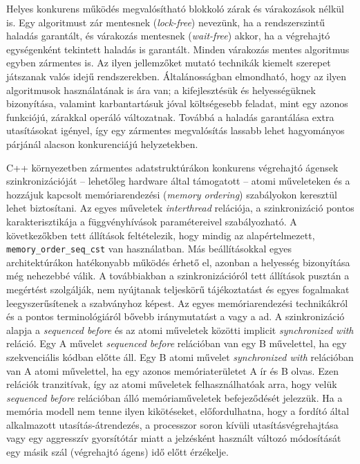     Helyes konkurens működés megvalósítható blokkoló zárak és várakozások nélkül is. Egy algoritmust zár mentesnek (\emph{lock-free}) nevezünk, ha a rendszerszintű haladás garantált, és várakozás mentesnek (\emph{wait-free}) akkor, ha a végrehajtó egységenként tekintett haladás is garantált. Minden várakozás mentes algoritmus egyben zármentes is. Az ilyen jellemzőket mutató technikák kiemelt szerepet játszanak valós idejű rendszerekben. Általánosságban elmondható, hogy az ilyen algoritmusok használatának is ára van; a kifejlesztésük és helyességüknek bizonyítása, valamint karbantartásuk jóval költségesebb feladat, mint egy azonos funkciójú, zárakkal operáló változatnak. Továbbá a haladás garantálása extra utasításokat igényel, így egy zármentes megvalósítás lassabb lehet hagyományos párjánál alacson konkurenciájú helyzetekben.
    
    C++ környezetben zármentes adatstruktúrákon konkurens végrehajtó ágensek szinkronizációját -- lehetőleg hardware által támogatott -- atomi műveleteken és a hozzájuk kapcsolt memóriarendezési (\emph{memory ordering}) szabályokon keresztül lehet biztosítani. Az egyes műveletek \emph{interthread} relációja, a szinkronizáció pontos karakterisztikája a függvényhívások paramétereivel szabályozható. A következőkben tett állítások feltételezik, hogy mindig az alapértelmezett, \texttt{memory\_order\_seq\_cst} van használatban. Más beállításokkal egyes architektúrákon hatékonyabb működés érhető el, azonban a helyesség bizonyítása még nehezebbé válik. A továbbiakban a szinkronizációról tett állítások pusztán a megértést szolgálják, nem nyújtanak teljeskörű tájékoztatást és egyes fogalmakat leegyszerűsítenek a szabványhoz képest. Az egyes memóriarendezési technikákról és a pontos terminológiáról bővebb iránymutatást a \cite{ConcurrencyInAction} vagy a \cite{C++11/MemoryModel} ad. A szinkronizáció alapja a \emph{sequenced before} és az atomi műveletek közötti implicit \emph{synchronized with} reláció. Egy A művelet \emph{sequenced before} relációban van egy B művelettel, ha egy szekvenciális kódban előtte áll. Egy B atomi művelet \emph{synchronized with} relációban van A atomi művelettel, ha egy azonos memóriaterületet A ír és B olvas. Ezen relációk tranzitívak, így az atomi műveletek felhasználhatóak arra, hogy velük \emph{sequenced before} relációban álló memóriaműveletek befejeződését jelezzük. Ha a memória modell nem tenne ilyen kikötéseket, előfordulhatna, hogy a fordító által alkalmazott utasítás-átrendezés, a processzor soron kívüli utasításvégrehajtása vagy egy aggresszív gyorsítótár miatt a jelzésként használt változó módosítását egy másik szál (végrehajtó ágens) idő előtt érzékelje.
    
